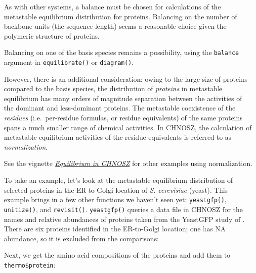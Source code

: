 \documentclass[]{tufte-handout}
\newenvironment{Shaded}{}{}
\newcommand{\KeywordTok}[1]{\textcolor[rgb]{0.00,0.44,0.13}{\textbf{#1}}}
\newcommand{\StringTok}[1]{\textcolor[rgb]{0.25,0.44,0.63}{#1}}
\newcommand{\OperatorTok}[1]{\textcolor[rgb]{0.40,0.40,0.40}{#1}}
\newcommand{\NormalTok}[1]{#1}
\begin{document}
As with other systems, a balance must be chosen for calculations of the
metastable equilibrium distribution for proteins. Balancing on the
number of backbone units (the sequence length) seems a reasonable choice
given the polymeric structure of proteins.

\begin{marginfigure}
Balancing on one of the basis species remains a possibility, using the
\texttt{balance} argument in {\texttt{equilibrate()}} or
{\texttt{diagram()}}.
\end{marginfigure}

However, there is an additional consideration: owing to the large size
of proteins compared to the basis species, the distribution of
\emph{proteins} in metastable equilibrium has many orders of magnitude
separation between the activities of the dominant and less-dominant
proteins. The metastable coexistence of the \emph{residues}
(i.e.~per-residue formulas, or residue equivalents) of the same proteins
spans a much smaller range of chemical activities. In CHNOSZ, the
calculation of metastable equilibrium activities of the residue
equivalents is referred to as \emph{normalization}.

\begin{marginfigure}
See the vignette \href{equilibrium.pdf}{{\emph{Equilibrium in CHNOSZ}}}
for other examples using normalization.
\end{marginfigure}

To take an example, let's look at the metastable equilibrium
distribution of selected proteins in the ER-to-Golgi location of
\emph{S. cerevisiae} (yeast). This example brings in a few other
functions we haven't seen yet: {\texttt{yeastgfp()}},
{\texttt{unitize()}}, and {\texttt{revisit()}}. {\texttt{yeastgfp()}}
queries a data file in CHNOSZ for the names and relative abundances of
proteins taken from the YeastGFP study of \citet{GHB_03}. There are six
proteins identified in the ER-to-Golgi location; one has NA abundance,
so it is excluded from the comparisons:

\begin{Shaded}
\end{Shaded}

Next, we get the amino acid compositions of the proteins and add them to
\texttt{thermo\$protein}:
\end{document}
